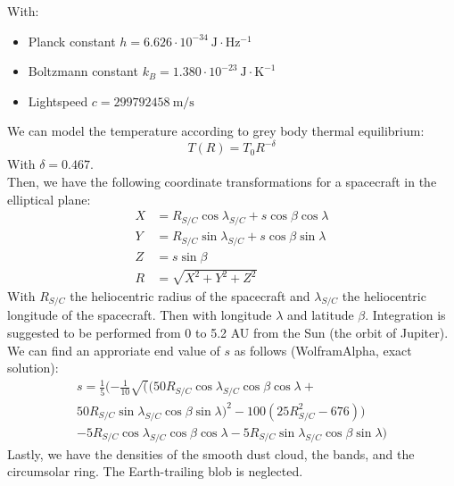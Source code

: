 \documentclass[a4paper,10pt]{article}
\begin{document}
With:
\begin{itemize}
 \item Planck constant $h = 6.626\cdot 10^{-34}~\mathrm{J\cdot Hz^{-1}}$
 \item Boltzmann constant $k_B = 1.380\cdot 10^{-23}~\mathrm{J\cdot K^{-1}}$
 \item Lightspeed $c = 299792458~\mathrm{m/s}$
\end{itemize}
We can model the temperature according to grey body thermal equilibrium:
\begin{equation}
 T(R) = T_0 R^{-\delta}
\end{equation}
With $\delta = 0.467$.\\

Then, we have the following coordinate transformations for a spacecraft in the elliptical plane:
\begin{align}
 X &= R_{S/C} \cos \lambda_{S/C} + s \cos \beta \cos \lambda \\
 Y &= R_{S/C} \sin \lambda_{S/C} + s \cos \beta \sin \lambda \\
 Z &= s \sin \beta\\
 R &= \sqrt{X^2 + Y^2 + Z^2}
\end{align}
With $R_{S/C}$ the heliocentric radius of the spacecraft and $\lambda_{S/C}$ the heliocentric longitude of the spacecraft. Then with longitude $\lambda$ and latitude $\beta$. Integration is suggested to be performed from 0 to 5.2 AU from the Sun (the orbit of Jupiter). We can find an approriate end value of $s$ as follows (WolframAlpha, exact solution):
\begin{equation}
\begin{aligned}
 s = \frac{1}{5}(-\frac{1}{10}\sqrt((50R_{S/C}\cos \lambda_{S/C}\cos\beta\cos\lambda + \\50R_{S/C}\sin\lambda_{S/C}\cos\beta\sin\lambda)^2 - 100(25R_{S/C}^2-676))\\ - 5R_{S/C}\cos\lambda_{S/C}\cos\beta\cos\lambda-5R_{S/C}\sin\lambda_{S/C}\cos\beta\sin\lambda)
\end{aligned}
\end{equation}
Lastly, we have the densities of the smooth dust cloud, the bands, and the circumsolar ring. The Earth-trailing blob is neglected.\\
\end{document}
